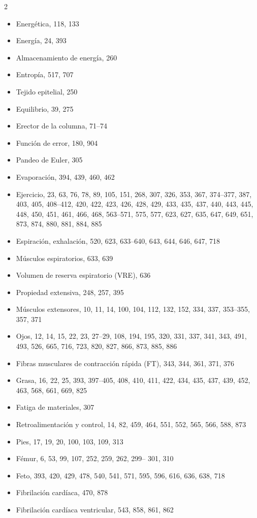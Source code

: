 \documentclass[12pt,a4paper]{book}
\begin{document}
\begin{multicols}{2}
\begin{itemize}[leftmargin=*]
  \item Energética, 118, 133
  \item Energía, 24, 393
  \item Almacenamiento de energía, 260
  \item Entropía, 517, 707
  \item Tejido epitelial, 250
  \item Equilibrio, 39, 275
  \item Erector de la columna, 71--74
  \item Función de error, 180, 904
  \item Pandeo de Euler, 305
  \item Evaporación, 394, 439, 460, 462
  \item Ejercicio, 23, 63, 76, 78, 89, 105, 151, 268, 307, 326, 353, 367, 374--377, 387, 403, 405, 408--412, 420, 422, 423, 426, 428, 429, 433, 435, 437, 440, 443, 445, 448, 450, 451, 461, 466, 468, 563--571, 575, 577, 623, 627, 635, 647, 649, 651, 873, 874, 880, 881, 884, 885
  \item Espiración, exhalación, 520, 623, 633--640, 643, 644, 646, 647, 718
  \item Músculos espiratorios, 633, 639
  \item Volumen de reserva espiratorio (VRE), 636
  \item Propiedad extensiva, 248, 257, 395
  \item Músculos extensores, 10, 11, 14, 100, 104, 112, 132, 152, 334, 337, 353--355, 357, 371
  \item Ojos, 12, 14, 15, 22, 23, 27--29, 108, 194, 195, 320, 331, 337, 341, 343, 491, 493, 526, 665, 716, 723, 820, 827, 866, 873, 885, 886
  \item Fibras musculares de contracción rápida (FT), 343, 344, 361, 371, 376
  \item Grasa, 16, 22, 25, 393, 397--405, 408, 410, 411, 422, 434, 435, 437, 439, 452, 463, 568, 661, 669, 825
  \item Fatiga de materiales, 307
  \item Retroalimentación y control, 14, 82, 459, 464, 551, 552, 565, 566, 588, 873
  \item Pies, 17, 19, 20, 100, 103, 109, 313
  \item Fémur, 6, 53, 99, 107, 252, 259, 262, 299-- 301, 310
  \item Feto, 393, 420, 429, 478, 540, 541, 571, 595, 596, 616, 636, 638, 718
  \item Fibrilación cardíaca, 470, 878
  \item Fibrilación cardíaca ventricular, 543, 858, 861, 862

\end{itemize}
\end{multicols}
\end{document}
